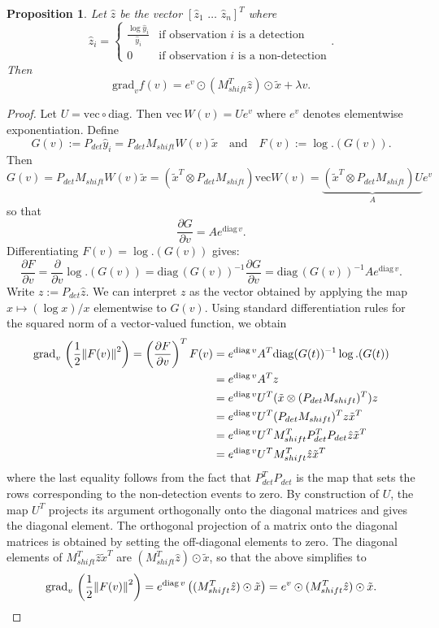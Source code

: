 \documentclass{article}
\newtheorem{proposition}{Proposition}
\begin{document}
\begin{proposition}
    Let $\hat{z}$ be the vector $[\hat{z}_1\,\,\dots\,\,\hat{z}_n]^T$ where 
    $$
    \hat{z}_i = \begin{cases}
        \frac{\log \hat{y}_i}{\hat{y}_i} & \text{if observation $i$ is a detection} \\
        0 & \text{if observation $i$ is a non-detection} 
    \end{cases}
    .$$
    Then
    $$
    \mathrm{grad}_{v} f(v) = e^v \odot (M_{shift}^T \hat{z}) \odot \tilde{x} + \lambda v
    .$$
\end{proposition}
\begin{proof}

Let $U = \mathrm{vec} \circ \mathrm{diag}$. Then $\mathrm{vec}\, W(v) = U e^v$ where $e^v$ denotes elementwise exponentiation.
Define $$
G(v) :=
P_{det} \hat{y}_i
=
P_{det} M_{shift} W(v) \tilde{x}
\quad\text{and}\quad
F(v) := \log.(G(v))
.$$
Then 
$$
G(v) = P_{det} M_{shift} W(v) \tilde{x}
=
(\tilde{x}^T \otimes P_{det} M_{shift}) \mathrm{vec} W(v)
=
\underbrace{(\tilde{x}^T \otimes P_{det}M_{shift}) U}_A e^v
$$
so that 
$$
\frac{\partial G}{\partial v} = A e^{\mathrm{diag}\, v}
.$$
Differentiating $F(v) = \log.(G(v))$ gives:
$$
\frac{\partial F}{\partial v}
=
\frac{\partial}{\partial v} \log.(G(v))
=
\mathrm{diag}\,(G(v))^{-1} \frac{\partial G}{\partial v}
=
\mathrm{diag}\,(G(v))^{-1} A e^{\mathrm{diag}\, v }
.$$
Write $z := P_{det} \hat{z}$.
We can interpret $z$ as the vector obtained by applying the map $x \mapsto (\log x) / x$ elementwise to $G(v)$.
Using standard differentiation rules for the squared norm of a vector-valued function, we obtain
\begin{align*}
\mathrm{grad}_v\, \left(\frac{1}{2} \norm{F(v)}^2 \right) =\left(\frac{\partial F}{\partial v}\right)^T F(v)
&= e^{\mathrm{diag}\, v} A^T \mathrm{diag}(G(t))^{-1} \log.(G(t)) \\
&= e^{\mathrm{diag}\, v} A^T z \\
&= e^{\mathrm{diag}\, v} U^T (\tilde{x} \otimes (P_{det} M_{shift})^T) z \\
&= e^{\mathrm{diag}\, v} U^T (P_{det} M_{shift})^T z \tilde{x}^T \\
&= e^{\mathrm{diag}\, v} U^T M_{shift}^T P_{det}^T P_{det} \hat{z} \tilde{x}^T \\
&= e^{\mathrm{diag}\, v} U^T M_{shift}^T \hat{z} \tilde{x}^T
\end{align*}
where the last equality follows from the fact that $P_{det}^T P_{det}$ is the map that sets the rows corresponding to the non-detection events to zero. 
By construction of $U$, the map $U^T$ projects its argument orthogonally onto the diagonal matrices and gives the diagonal element. The orthogonal projection of a matrix onto the diagonal matrices is obtained by setting the off-diagonal elements to zero. The diagonal elements of $M_{shift}^T \hat{z} \tilde{x}^T$ are $(M_{shift}^T \hat{z}) \odot \tilde{x}$, so that the above simplifies to
$$
\mathrm{grad}_v\, \left(\frac{1}{2} \norm{F(v)}^2 \right)
=
e^{\mathrm{diag}\, v} \left((M_{shift}^T \hat{z}) \odot \tilde{x}\right)
=
e^v \odot (M_{shift}^T \hat{z}) \odot \tilde{x}
.$$


\end{proof}
\end{document}
